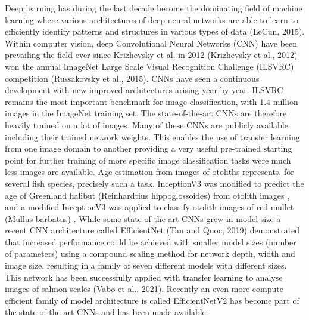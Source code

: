 \documentclass[10pt,letterpaper]{article}
\begin{document}
Deep learning has during the last decade become the dominating field of machine learning where various architectures of deep neural networks are able to learn to efficiently identify patterns and structures in various types of data \citep{lecun2015deep}(LeCun, 2015). Within computer vision, deep Convolutional Neural Networks (CNN) have been prevailing the field ever since Krizhevsky et al.  in 2012 \citep{krizhevsky_imagenet_2012}(Krizhevsky et al., 2012) won the annual ImageNet Large Scale Visual Recognition Challenge (ILSVRC) competition  \citep{Russakovsky2015}(Russakovsky et al., 2015). CNNs have seen a continuous development with new improved architectures arising year by year. ILSVRC remains the most important benchmark for image classification, with 1.4 million images in the ImageNet training set. The state-of-the-art CNNs are therefore heavily trained on a lot of images. Many of these CNNs are publicly available including their trained network weights. This enables the use of transfer learning from one image domain to another providing a very useful pre-trained starting point for further training of more specific image classification tasks were much less images are available. Age estimation from images of otoliths represents, for several fish species, precisely such a task. InceptionV3 \citep{Szegedy2015} was modified to predict the age of Greenland halibut (Reinhardtius hippoglossoides) from otolith images \citep{moenetal}, and a modified InceptionV3 was applied to classify otolith images of red mullet (Mullus barbatus) \citep{Politikos}. While some state-of-the-art CNNs grew in model size a recent CNN architecture called EfficientNet \citep{DBLP:journals/corr/abs-1905-11946}(Tan and Quoc, 2019) demonstrated that increased performance could be achieved with smaller model sizes (number of parameters) using a compound scaling method for network depth, width and image size, resulting in a family of seven different models with different sizes. This network has been successfully applied with transfer learning to analyse images of salmon scales \citep{vaboeetal}(Vabø et al., 2021). Recently an even more compute efficient family of model architecture is called EfficientNetV2 \citep{EfficientNetV2} has become part of the state-of-the-art CNNs and has been made available.
\end{document}

